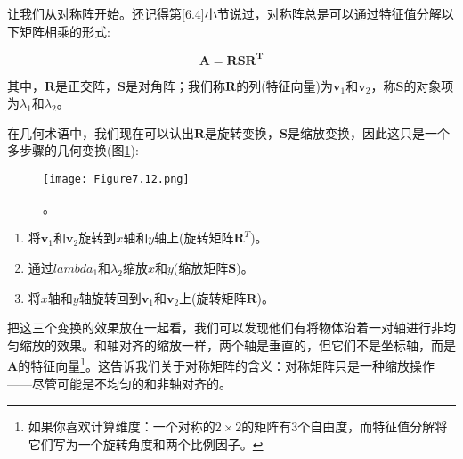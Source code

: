 让我们从对称阵开始。还记得第\ref{6.4}小节说过，对称阵总是可以通过特征值分解以下矩阵相乘的形式:

\begin{equation}
    \mathbf{A} = \mathbf{R}\mathbf{S}\mathbf{R}^{\mathbf{T}}
    \nonumber
\end{equation}

其中，$\mathbf{R}$是正交阵，$\mathbf{S}$是对角阵；我们称$\mathbf{R}$的列(特征向量)为$\mathbf{v}_{1}$和$\mathbf{v}_{2}$，称$\mathbf{S}$的对象项为$\lambda_{1}$和$\lambda_{2}$。

在几何术语中，我们现在可以认出$\mathbf{R}$是旋转变换，$\mathbf{S}$是缩放变换，因此这只是一个多步骤的几何变换(图\ref{fig:7.12}):

\begin{figure}[htbp]
	\centering
	\texttt{[image: Figure7.12.png]}
	\caption{。}
	\label{fig:7.12}
\end{figure}	

\begin{enumerate}
	\item 将$\mathbf{v}_{1}$和$\mathbf{v}_{2}$旋转到$x$轴和$y$轴上(旋转矩阵$\mathbf{R}^{T}$)。
	
	\item 通过$lambda_{1}$和$\lambda_{2}$缩放$x$和$y$(缩放矩阵$\mathbf{S}$)。
	
	\item 将$x$轴和$y$轴旋转回到$\mathbf{v}_{1}$和$\mathbf{v}_{2}$上(旋转矩阵$\mathbf{R}$)。
\end{enumerate}

把这三个变换的效果放在一起看，我们可以发现他们有将物体沿着一对轴进行非均匀缩放的效果。和轴对齐的缩放一样，两个轴是垂直的，但它们不是坐标轴，而是$\mathbf{A}$的特征向量\footnote{如果你喜欢计算维度：一个对称的$2 \times 2$的矩阵有3个自由度，而特征值分解将它们写为一个旋转角度和两个比例因子。}。这告诉我们关于对称矩阵的含义：对称矩阵只是一种缩放操作——尽管可能是不均匀的和非轴对齐的。

\begin{example}




\end{example}
	







